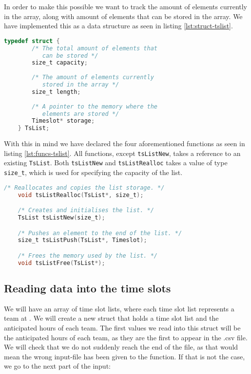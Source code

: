 In order to make this possible we want to track the amount of elements currently in the array, along with amount of elements that can be stored in the array. We have implemented this as a data structure as seen in listing \ref{lst:struct-tslist}.
\begin{lstlisting}[caption={Definition of the list structure},label={lst:struct-tslist},language=C]
    typedef struct {
        /* The total amount of elements that
           can be stored */
        size_t capacity;
        
        /* The amount of elements currently
           stored in the array */
        size_t length;
        
        /* A pointer to the memory where the
           elements are stored */
        Timeslot* storage;
    } TsList;
\end{lstlisting}
With this in mind we have declared the four aforementioned functions as seen in listing \ref{lst:funcs-tslist}. All functions, except \verb|tsListNew|, takes a reference to an existing \verb|TsList|. Both \verb|tsListNew| and \verb|tsListRealloc| takes a value of type \verb|size_t|, which is used for specifying the capacity of the list.
\begin{lstlisting}[caption={Declarations of TsList functions.},label={lst:funcs-tslist},language=C]
    /* Reallocates and copies the list storage. */
    void tsListRealloc(TsList*, size_t);

    /* Creates and initialises the list. */
    TsList tsListNew(size_t);

    /* Pushes an element to the end of the list. */
    size_t tsListPush(TsList*, Timeslot);

    /* Frees the memory used by the list. */
    void tsListFree(TsList*);

\end{lstlisting}

\subsection{Reading data into the time slots}
We will have an array of time slot lists, where each time slot list represents a team at \siemens. We will create a new struct that holds a time slot list and the anticipated hours of each team. The first values we read into this struct will be the anticipated hours of each team, as they are the first to appear in the .csv file. We will check that we do not suddenly reach the end of the file, as that would mean the wrong input-file has been given to the function. If that is not the case, we go to the next part of the input:

